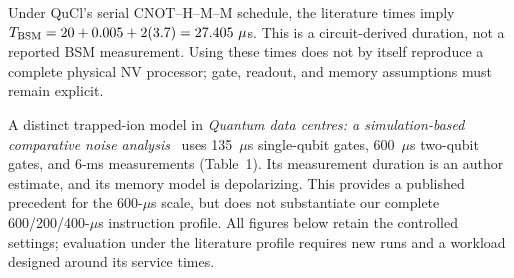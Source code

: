 Under QuCl's serial CNOT--H--M--M schedule, the literature times imply
$T_{\rm BSM}=20+0.005+2(3.7)=27.405~\mu$s.
This is a circuit-derived duration, not a reported BSM measurement.
Using these times does not by itself reproduce a complete physical NV
processor; gate, readout, and memory assumptions must remain explicit.

A distinct trapped-ion model in \emph{Quantum data centres: a
simulation-based comparative noise analysis}~\cite{campbell2025qdc}
uses 135~$\mu$s single-qubit gates, 600~$\mu$s two-qubit gates, and
6-ms measurements (Table~1). Its measurement duration is an author
estimate, and its memory model is depolarizing. This provides a
published precedent for the 600-$\mu$s scale, but does not substantiate
our complete 600/200/400-$\mu$s instruction profile. All figures below
retain the controlled settings; evaluation under the literature profile
requires new runs and a workload designed around its service times.
